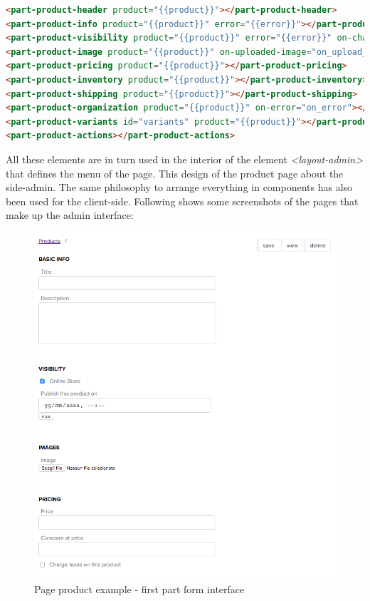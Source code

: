 \begin{lstlisting}[language=html]
<part-product-header product="{{product}}"></part-product-header>
<part-product-info product="{{product}}" error="{{error}}"></part-product-info>
<part-product-visibility product="{{product}}" error="{{error}}" on-change-visibility="on_change_visibility"></part-product-visibility>
<part-product-image product="{{product}}" on-uploaded-image="on_upload_image"></part-product-image>
<part-product-pricing product="{{product}}"></part-product-pricing>
<part-product-inventory product="{{product}}"></part-product-inventory>
<part-product-shipping product="{{product}}"></part-product-shipping>
<part-product-organization product="{{product}}" on-error="on_error"></part-product-organization>
<part-product-variants id="variants" product="{{product}}"></part-product-variants>
<part-product-actions></part-product-actions>
\end{lstlisting}
All these elements are in turn used in the interior of the element \emph{<layout-admin>} that defines the menu of the page. This design of the product page about the side-admin.
The same philosophy to arrange everything in components has also been used for the client-side.
\newline
Following shows some screenshots of the pages that make up the admin interface:
\begin{figure}[htb]
\centering
\includegraphics[width=1.0\linewidth]{images/chapter4/products-example.png}\hfill
\caption[page product first part form]{Page product example - first part form interface}
\label{fig:design_page}
\end{figure}

